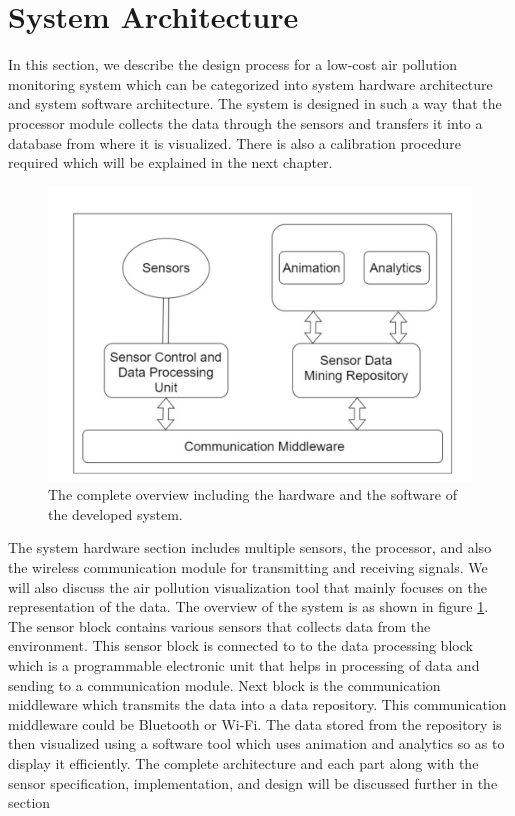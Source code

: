 \section{System Architecture}
    

     In this section, we describe the design process for a low-cost air pollution monitoring system which can be categorized into system hardware architecture and system software architecture. The system is designed in such a way that the processor module collects the data through the sensors and transfers it into a database from where it is visualized. There is also a calibration procedure required which will be explained in the next chapter.
     \begin{figure}[h]
      \begin{center}
      \includegraphics[scale=0.65]{images/figure2.png}
      \end{center}
      
      \caption{The complete overview including the hardware and the software of the developed system.}
      \label{overview}
  
    \end{figure}

  \hspace{1 cm}


    The system hardware section includes multiple sensors, the processor, and also the wireless communication module for transmitting and receiving signals. We will also discuss the air pollution visualization tool that mainly focuses on the representation of the data. The overview of the system is as shown in figure \ref{overview}. The sensor block contains various sensors that collects data from the environment. This sensor block is connected to to the data processing block which is a programmable electronic unit that helps in processing of data and sending to a communication module. Next block is the communication middleware which transmits the data into a data repository. This communication middleware could be Bluetooth or Wi-Fi. The data stored from the repository is then visualized using a software tool which uses animation and analytics so as to display it efficiently.  The complete architecture and each part along with the sensor specification, implementation, and design will be discussed further in the section
    
